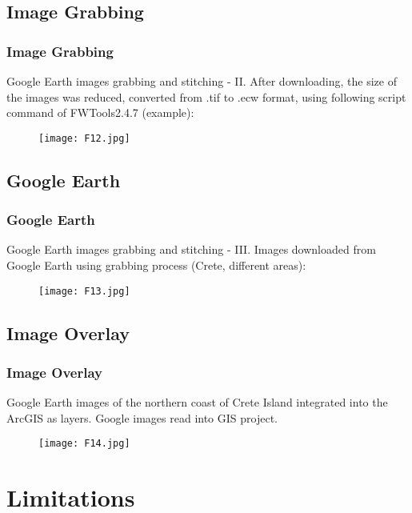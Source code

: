 \documentclass[pdflatex,compress]{beamer}
\begin{document}
\subsection{Image Grabbing}
\begin{frame}\frametitle{Image Grabbing}
\scriptsize{Google Earth images grabbing and stitching - II. After downloading, the size of the images was reduced, converted from .tif to .ecw format, using following script command of FWTools2.4.7 (example):}
\begin{figure}[H]
	\centering
		\texttt{[image: F12.jpg]}
\end{figure}
\end{frame}

\subsection{Google Earth}
\begin{frame}\frametitle{Google Earth}
\scriptsize{Google Earth images grabbing and stitching - III. Images downloaded from Google Earth using grabbing process (Crete, different areas):}
\begin{figure}[H]
	\centering
		\texttt{[image: F13.jpg]}
\end{figure}
\end{frame}

\subsection{Image Overlay}
\begin{frame}\frametitle{Image Overlay}
Google Earth images of the northern coast of Crete Island integrated into the ArcGIS as layers. Google images read into GIS project.
\begin{figure}[H]
	\centering
		\texttt{[image: F14.jpg]}
\end{figure}
\end{frame}

\section{Limitations}
\end{document}
